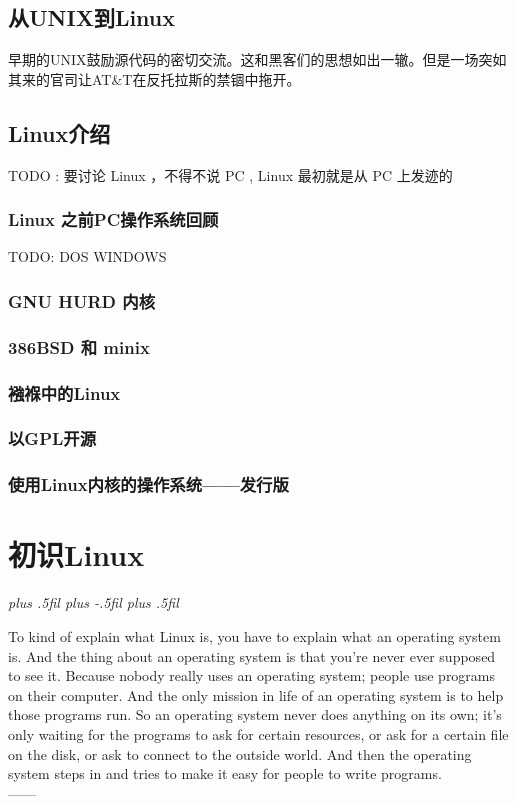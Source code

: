 \documentclass[amstex,twoside]{ctexbook}
\newcommand{\RTLpar}{%
  \leftskip=0pt plus .5fil%
  \rightskip=0pt plus -.5fil%
  \parfillskip=0pt plus .5fil%
}
\newenvironment{quotes}[2][0.55]{\pushQED{#2}%
\begin{flushright}%
\begin{minipage}{#1\textwidth}\begin{flushright}\noindent\it\RTLpar}{%
 \\------\popQED{}\end{flushright}\end{minipage}\end{flushright}}%
\begin{document}
\section{从UNIX到Linux}

早期的UNIX鼓励源代码的密切交流。这和黑客们的思想如出一辙。但是一场突如其来的官司让AT\&T在反托拉斯的禁锢中拖开。



\section{Linux介绍}

TODO :  要讨论 Linux ，不得不说 PC , Linux 最初就是从 PC 上发迹的

\subsection{Linux 之前PC操作系统回顾}

TODO:  DOS WINDOWS
\subsection{GNU HURD 内核}

 
\subsection{386BSD 和 minix}



\subsection{襁褓中的Linux}
\subsection{以GPL开源}

\subsection{使用Linux内核的操作系统——发行版}


\chapter{初识Linux}

\begin{quotes}[0.63]{Linus~Torvalds}
To kind of explain what Linux is, you have to explain what an operating system is. And the thing about an operating system is that you're never ever supposed to see it. Because nobody really uses an operating system; people use programs on their computer. And the only mission in life of an operating system is to help those programs run. So an operating system never does anything on its own; it's only waiting for the programs to ask for certain resources, or ask for a certain file on the disk, or ask to connect to the outside world. And then the operating system steps in and tries to make it easy for people to write programs.
\end{quotes}
\end{document}
